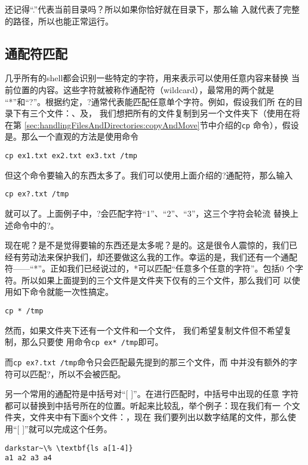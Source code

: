 还记得``.''代表当前目录吗？所以如果你恰好就在目录下，那么输
入就代表了完整的路径，所以也能正常运行。

\subsection{通配符匹配}
\label{sec:shell:commandLine:wildcard}
几乎所有的shell都会识别一些特定的字符，用来表示可以使用任意内容来替换
当前位置的内容。这些字符就被称作通配符（wildcard），最常用的两个就是
``*''和``?''。根据约定，?通常代表能匹配任意单个字符。例如，假设我们所
在的目录下有三个文件：、及，
我们想把所有的文件复制到另一个文件夹下（使用在将在第
\ref{sec:handlingFilesAndDirectories:copyAndMove}节中介绍的\texttt{cp}
命令），假设是。那么一个直观的方法是使用命令
\begin{verbatim}
cp ex1.txt ex2.txt ex3.txt /tmp
\end{verbatim}
但这个命令要输入的东西太多了。我们可以使用上面介绍的?通配符，那么输入
\begin{verbatim}
cp ex?.txt /tmp
\end{verbatim}
就可以了。上面例子中，?会匹配字符``1''、``2''、``3''，这三个字符会轮流
替换上述命令中的?。

现在呢？是不是觉得要输的东西还是太多呢？是的。这是很令人震惊的，我们已
经有劳动法来保护我们，却还要做这么我的工作。幸运的是，我们还有一个通配
符——``*''。正如我们已经说过的，*可以匹配``任意多个任意的字符''。包括0
个字符。所以如果上面提到的三个文件是文件夹下仅有的三个文件，那么我们可
以使用如下命令就能一次性搞定。
\begin{verbatim}
cp * /tmp
\end{verbatim}
然而，如果文件夹下还有一个文件和一个文件，
我们希望复制文件但不希望复制，那么只要使
用命令\verb|cp ex* /tmp|即可。

而\verb|cp ex?.txt /tmp|命令只会匹配最先提到的那三个文件，而
中并没有额外的字符可以匹配?，所以不会被匹配。

另一个常用的通配符是中括号对``[ ]''。在进行匹配时，中括号中出现的任意
字符都可以替换到中括号所在的位置。听起来比较乱，举个例子：现在我们有一
个文件夹，文件夹中有下面8个文件：，现在
我们要列出以数字结尾的文件，那么使用``[ ]''就可以完成这个任务。
\begin{Verbatim}[frame=single, commandchars=\\\{\}]
darkstar~\% \textbf{ls a[1-4]}
a1 a2 a3 a4
\end{Verbatim}

